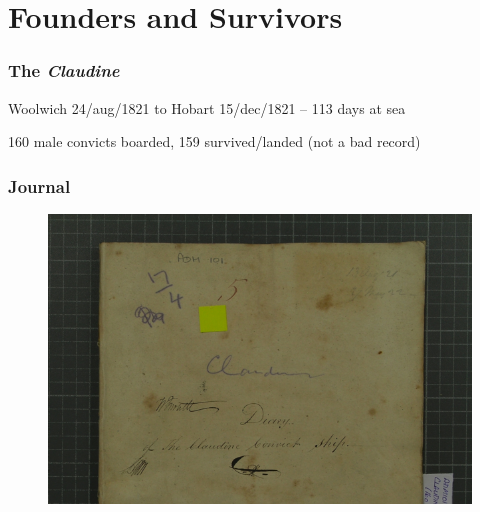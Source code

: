 \documentclass[ignorenonframetext,11pt]{beamer}
\date{2 March 2010}
\institute{\affiliation}
\date[\mydate]{\mydate~ / \event }
\title[\mytitle\hspace{2em}\insertframenumber/
\inserttotalframenumber]{\mytitle}
\author{\myauthor}
\begin{document}
\frame{\setlength\parskip{0pt}\titlepage}


\section{Founders and Survivors}
\label{foundersandsurvivors}

\begin{frame}
\frametitle{The {\itshape Claudine}}
\label{theclaudine}

Woolwich 24/aug/1821 to Hobart 15/dec/1821 -- 113 days at sea


160 male convicts boarded, 159 survived/landed (not a bad record)



\end{frame}
		

\begin{frame}
\frametitle{Journal}
\label{journal}

\begin{figure}
	\label{journal}
	\begin{center}
	\includegraphics[keepaspectratio,width=\textwidth, height=.75\textheight]{images/claudine33.png}
	\end{center}
	\end{figure}
	



\end{frame}
		
\end{document}

